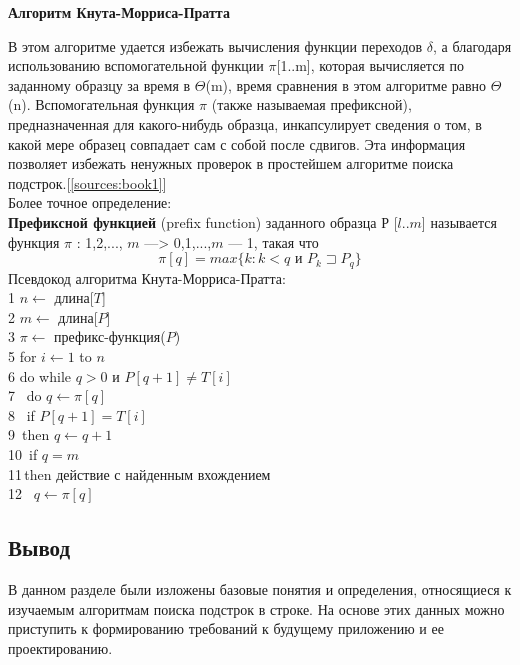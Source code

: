 \documentclass[a4paper,12pt]{article}
\begin{document}
\begin{center}
\textbf{Алгоритм Кнута-Морриса-Пратта}
\end{center}
В этом алгоритме удается избежать вычисления функции переходов $\delta$, а благодаря использованию вспомогательной функции $\pi$[1..m], которая вычисляется по заданному образцу за время в $\Theta$(m), время сравнения в этом алгоритме равно $\Theta$(n). Вспомогательная функция $\pi$ (также называемая префиксной), предназначенная для какого-нибудь образца, инкапсулирует сведения о том, в какой мере образец совпадает сам с собой после сдвигов. Эта информация позволяет избежать ненужных проверок в простейшем алгоритме поиска подстрок.[\ref{sources:book1}] \\
Более точное определение: \\
\textbf{Префиксной функцией} (prefix function) заданного образца $Р$ [$l$..$m$] называется функция $\pi$ : {1,2,..., $m$} —> {0,1,...,$m$ — 1}, такая что \\
\begin{equation}
\pi[q] = max \{k : k < q \text{ и } P_k \sqsupset P_q\}
\end{equation}
Псевдокод алгоритма Кнута-Морриса-Пратта: \\
1 $n \leftarrow$ длина[$T$] \\
2 $m \leftarrow$ длина[$P$] \\ 
3 $\pi \leftarrow$  префикс-функция($P$) \\
5 for $i \leftarrow 1$ to $n$ \\
6 \quad do while $q > 0$ и $P[q+1] \neq T[i]$ \\ 
7 \qquad\,    do $q \leftarrow \pi[q]$ \\
8 \qquad\,    if $P[q+1] = T[i]$ \\
9 \qquad\,\qquad     then $q \leftarrow q + 1$ \\
10\qquad\,	  if $q = m$ \\
11\qquad\,\qquad     then действие с найденным вхождением \\
12\qquad\,\qquad\,\qquad\   $q \leftarrow \pi[q]$ \\

\newpage
\subsection{Вывод}
В данном разделе были изложены базовые понятия и определения, относящиеся к изучаемым алгоритмам поиска подстрок в строке. На основе этих данных можно приступить к формированию требований к будущему приложению и ее проектированию.
\end{document}
